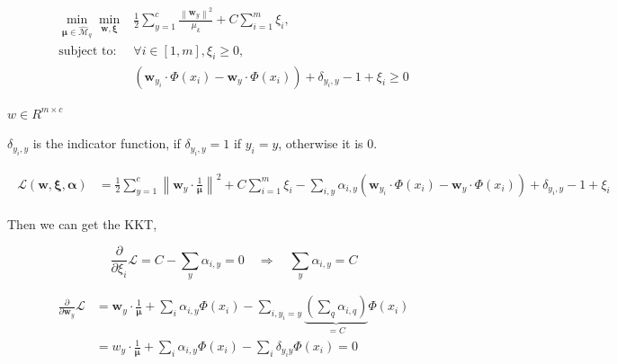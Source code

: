 \documentclass{article}
\begin{document}
\begin{equation}
    \begin{aligned}
        \min _{\boldsymbol{\mu} \in \widehat{\mathcal{M}}_{q}} \min _{\mathbf{w}, \boldsymbol{\xi}}
         & \frac{1}{2}  \sum_{y=1}^{c} \frac{\left\|\mathbf{w}_{y}\right\|^{2}}{\mu_{k}}+C \sum_{i=1}^{m} \xi_{i},                                         \\
        \text{subject to: }
         & \forall i \in[1, m], \xi_{i} \geq 0,                                                                                                            \\
         & \left(\mathbf{w}_{y_{i}} \cdot \Phi\left(x_{i}\right)-\mathbf{w}_{y} \cdot \Phi\left(x_{i}\right)\right) + \delta_{y_i, y} - 1 + \xi_{i} \geq 0
    \end{aligned}
\end{equation}


$w \in R^{m \times c}$

$\delta_{y_i, y}$ is the indicator function, if $\delta_{y_i, y} = 1$ if $y_i = y$, otherwise it is 0.

\begin{align}
    \begin{aligned}
        \mathcal{L}(\mathbf{w}, \boldsymbol{\xi}, \bm{\alpha})
         & = \frac{1}{2}  \sum_{y=1}^{c} {\left\|\mathbf{w}_{y} \cdot \frac{1}{\bm{\mu}} \right\|^{2}}
        + C \sum_{i=1}^{m} \xi_{i}
        - \sum_{i, y} \alpha_{i, y}\left(\mathbf{w}_{y_{i}} \cdot \Phi\left(x_{i}\right)-\mathbf{w}_{y} \cdot \Phi\left(x_{i}\right)\right) + \delta_{y_i, y} - 1 + \xi_{i}
    \end{aligned}
\end{align}

Then we can get the KKT,

\begin{equation}
    \frac{\partial}{\partial \xi_{i}} \mathcal{L}=C- \sum_{y} \alpha_{i, y}=0 \quad \Rightarrow \quad \sum_{y} \alpha_{i, y} = C
    \label{eq:2b_xi}
\end{equation}


\begin{equation}
    \begin{aligned}
        \frac{\partial}{\partial \bm{w}_{y}} \mathcal{L} & =
        \bm{w}_{y} \cdot \frac{1}{\bm{\mu}} + \sum_{i} \alpha_{i, y} \Phi({x}_{i})-\sum_{i, y_{i}=y} \underbrace{\left(\sum_{q} \alpha_{i, q}\right)}_{=C} \Phi({x}_{i})      \\
                                                         & ={w}_{y} \cdot \frac{1}{\bm{\mu}} + \sum_{i} \alpha_{i, y} \Phi({x}_{i})-\sum_{i} \delta_{y_{i} y} \Phi({x}_{i})=0
    \end{aligned}
\end{equation}
\end{document}
